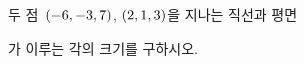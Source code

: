 두 점~$(-6{,}\mkern3mu\mathopen{}-3{,}\mkern3mu\mathopen{}7)$, $(2{,}\mkern3mu\mathopen{}1{,}\mkern3mu\mathopen{}3)$을 지나는 직선과 평면 \par\smallskip{}\par\smallskip\noindent 가 이루는 각의 크기를 구하시오.
